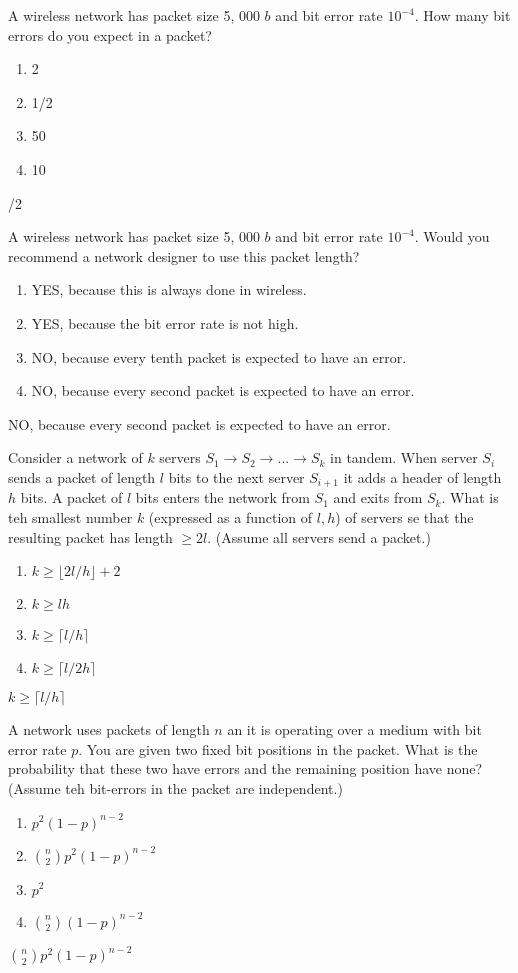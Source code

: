 \documentclass[a4 paper]{article}
\begin{document}
A wireless network has packet size 5, 000 $b$ and bit error rate $10^{-4}$. How many bit errors do you expect in a packet?
\begin{enumerate}
	\item 2
	\item 1/2
	\item 50
	\item 10
\end{enumerate}
/2

A wireless network has packet size 5, 000 $b$ and bit error rate $10^{-4}$. Would you recommend a network designer to use this packet length?
\begin{enumerate}
	\item YES, because this is always done in wireless.
	\item YES, because the bit error rate is not high.
	\item NO, because every tenth packet is expected to have an error.
	\item NO, because every second packet is expected to have an error.
\end{enumerate}
\solution NO, because every second packet is expected to have an error.

Consider a network of $k$ servers $S_1\rightarrow S_2\rightarrow ...\rightarrow S_k$ in tandem. When server $S_i$ sends a packet of length $l$ bits to the next server $S_{i+1}$ it adds a header of length $h$ bits. A packet of $l$ bits enters the network from $S_1$ and exits from $S_k$. What is teh smallest number $k$ (expressed as a function of $l,h$) of servers se that the resulting packet has length $\ge 2l$. (Assume all servers send a packet.)
\begin{enumerate}
	\item $k\ge \lfloor{2l/h}\rfloor + 2$
	\item $k\ge lh$
	\item $k\ge \lceil{l/h}\rceil$
	\item $k\ge \lceil{l/2h}\rceil$
\end{enumerate}
\solution $k\ge \lceil{l/h}\rceil$

A network uses packets of length $n$ an it is operating over a medium with bit error rate $p$. You are given two fixed bit positions in the packet. What is the probability that these two have errors and the remaining position have none? (Assume teh bit-errors in the packet are independent.)
\begin{enumerate}
	\item $p^{2}(1-p)^{n-2}$
	\item ${n\choose 2} p^{2}(1-p)^{n-2}$
	\item $p^{2}$
	\item ${n\choose 2}(1-p)^{n-2}$
\end{enumerate}
\solution ${n\choose 2} p^{2}(1-p)^{n-2}$
\end{document}

